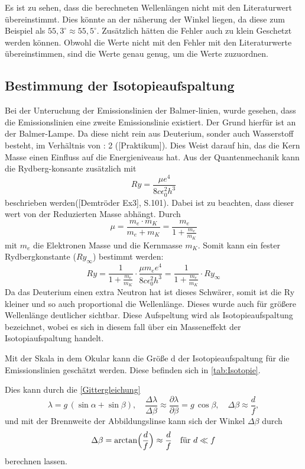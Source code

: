 Es ist zu sehen, dass die berechneten Wellenlängen nicht mit den Literaturwert übereinstimmt. 
Dies könnte an der näherung der Winkel liegen, da diese zum Beispiel als $55,3^\circ \approx 55,5^\circ$.
Zusätzlich hätten die Fehler auch zu klein Geschetzt werden können.
Obwohl die Werte nicht mit den Fehler mit den Literaturwerte übereinstimmen, sind die Werte genau genug, um die Werte zuzuordnen. 


\subsection{Bestimmung der Isotopieaufspaltung}

Bei der Unteruchung der Emissionslinien der Balmer-linien, wurde gesehen, dass die Emissionslinien eine zweite Emissionslinie existiert.
Der Grund hierfür ist an der Balmer-Lampe. 
Da diese nicht rein aus Deuterium, sonder auch Wasserstoff besteht, im Verhältnis von  : 2 ([Praktikum]). 
Dies Weist darauf hin, das die Kern Masse einen Einfluss auf die Energieniveaus hat. 
Aus der Quantenmechanik kann die Rydberg-konsante zusätzlich mit 
\begin{equation}
    Ry = \frac{\mu e^4}{8 c \epsilon_0^2h^3}
\end{equation}
beschrieben werden([Demtröder Ex3], S.101). Dabei ist zu beachten, dass dieser wert von der Reduzierten Masse abhängt.
Durch 
\begin{equation}
    \mu = \frac{m_e \cdot m_K}{m_e + m_K} = \frac{m_e}{1+\frac{m_e}{m_K}}
\end{equation}
mit $m_e$ die Elektronen Masse und die Kernmasse $m_K$.
Somit kann ein fester Rydbergkonstante ($Ry_\infty$) bestimmt werden: 
\begin{equation}
    Ry = \frac{1}{1+\frac{m_e}{m_K}}\cdot \frac{\mu m_e e^4}{8c \epsilon_0^2h^3} = \frac{1}{1 + \frac{m_e}{m_K}}\cdot Ry_\infty
\end{equation}
Da das Deuterium einen extra Neutron hat ist dieses Schwärer, somit ist die Ry kleiner und so auch proportional die Wellenlänge. 
Dieses wurde auch für größere Wellenlänge deutlicher sichtbar.
Diese Aufspeltung wird als Isotopieaufspaltung bezeichnet, wobei es sich in diesem fall über ein Masseneffekt der Isotopiaufspaltung handelt.

Mit der Skala in dem Okular kann die Größe d der Isotopieaufspaltung für die Emissionslinien geschätzt werden. 
Diese befinden sich in \cref{tab:Isotopie}.

Dies kann durch die \cref{Gittergleichung}
\begin{equation}
  \lambda = g\,(\sin\alpha + \sin\beta),
  \quad
\frac{\Delta\lambda}{\Delta\beta} \approx 
  \frac{\partial\lambda}{\partial\beta} = g\,\cos\beta,
  \quad
  \Delta\beta \approx \frac{d}{f},
\end{equation}
und mit der Brennweite der Abbildungslinse kann sich der Winkel $\Delta\beta$ durch 
\begin{equation}
    \Delta\beta = \arctan\Bigl(\frac{d}{f}\Bigr) \approx \frac{d}{f} \quad \text{für } d \ll f
\end{equation}
berechnen lassen.

